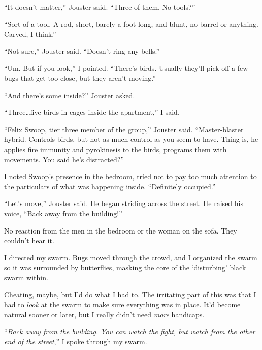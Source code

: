 ``It doesn't matter,'' Jouster said.  ``Three of them.  No tools?''



``Sort of a tool.  A rod, short, barely a foot long, and blunt, no barrel or anything.  Carved, I think.''



``Not sure,'' Jouster said.  ``Doesn't ring any bells.''



``Um.  But if you look,'' I pointed.  ``There's birds.  Usually they'll pick off a few bugs that get too close, but they aren't moving.''



``And there's some inside?'' Jouster asked.



``Three\ldots five birds in cages inside the apartment,'' I said.



``Felix Swoop, tier three member of the group,'' Jouster said.  ``Master-blaster hybrid.  Controls birds, but not as much control as you seem to have.  Thing is, he applies fire immunity and pyrokinesis to the birds, programs them with movements.  You said he's distracted?''



I noted Swoop's presence in the bedroom, tried not to pay too much attention to the particulars of what was happening inside.  ``Definitely occupied.''



``Let's move,'' Jouster said.  He began striding across the street.  He raised his voice, ``Back away from the building!''



No reaction from the men in the bedroom or the woman on the sofa.  They couldn't hear it.



I directed my swarm.  Bugs moved through the crowd, and I organized the swarm so it was surrounded by butterflies, masking the core of the `disturbing' black swarm within.



Cheating, maybe, but I'd do what I had to.  The irritating part of this was that I had to \emph{look} at the swarm to make sure everything was in place.  It'd become natural sooner or later, but I really didn't need \emph{more} handicaps.



``\emph{Back away from the building.  You can watch the fight, but watch from the other end of the street},'' I spoke through my swarm.



